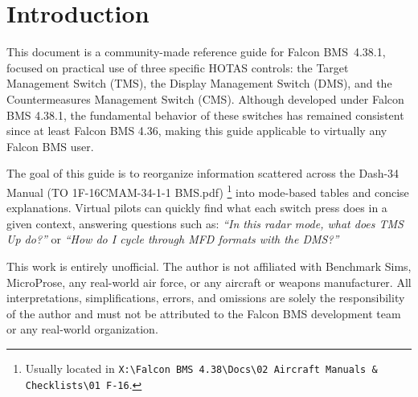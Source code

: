 \documentclass[11pt, a4paper, twoside]{report}
\newcommand{\bmsver}{Falcon BMS~4.38.1}
\begin{document}

\chapter{Introduction}
\label{chap:C1}

This document is a community-made reference guide for \bmsver, focused on practical use of three specific HOTAS controls: the Target Management Switch (TMS), the Display Management Switch (DMS), and the Countermeasures Management Switch (CMS). Although developed under Falcon BMS 4.38.1, the fundamental behavior of these switches has remained consistent since at least Falcon BMS 4.36, making this guide applicable to virtually any Falcon BMS user.

The goal of this guide is to reorganize information scattered across the Dash-34 Manual (TO 1F-16CMAM-34-1-1 BMS.pdf) \footnote{Usually located in \texttt{X:\textbackslash Falcon BMS 4.38\textbackslash Docs\textbackslash02 Aircraft Manuals \& Checklists\textbackslash 01 F-16}.} into mode-based tables and concise explanations. Virtual pilots can quickly find what each switch press does in a given context, answering questions such as: \emph{``In this radar mode, what does TMS Up do?''} or \emph{``How do I cycle through MFD formats with the DMS?''}

This work is entirely unofficial. The author is not affiliated with Benchmark Sims, MicroProse, any real-world air force, or any aircraft or weapons manufacturer. All interpretations, simplifications, errors, and omissions are solely the responsibility of the author and must not be attributed to the Falcon BMS development team or any real-world organization.
\end{document}
